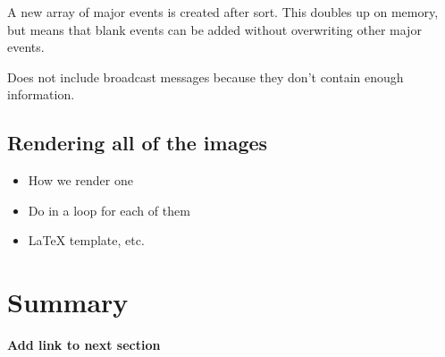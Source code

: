 A new array of major events is created after sort. This doubles up on memory, but means that blank events can be added without overwriting other major events.

Does not include broadcast messages because they don't contain enough information.

\subsection{Rendering all of the images}
\begin{itemize}
    \item How we render one
    \item Do in a loop for each of them
    \item LaTeX template, etc.
\end{itemize}

\section{Summary}
\textbf{Add link to next section}